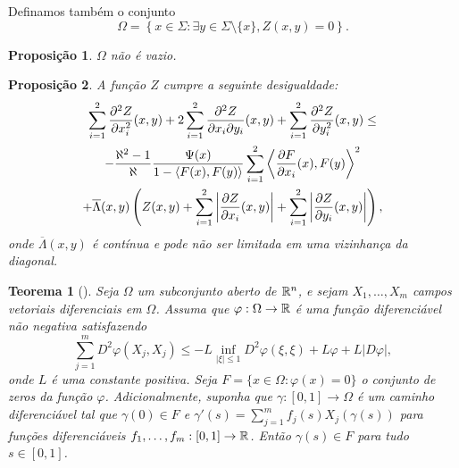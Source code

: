 \documentclass[12pt,a4paper]{beamer}
\newtheorem{teorema}{Teorema}
\newtheorem{proposicao}{Proposição}
\theoremstyle{definition}
\begin{document}
\begin{frame}
		Definamos também o conjunto
	\begin{equation*}
	\Omega = \left\{ x \in \Sigma: \exists y \in \Sigma \setminus \{ x \}, Z(x,y)=0 \right\}.
	\end{equation*}
	
	\begin{proposicao}
		$\Omega$ não é vazio.
	\end{proposicao}
\end{frame}

\begin{frame}
	\begin{proposicao}\label{sum-2nd-derivative-z-inequality}
		A função $Z$ cumpre a seguinte desigualdade:
		\begin{multline*}
			\sum_{i=1}^{2} \frac{\partial^2 Z}{\partial x_i^2}(x,y) + 2 \sum_{i=1}^{2} \frac{\partial^2 Z}{\partial x_i \partial y_i}(x,y) + \sum_{i=1}^{2} \frac{\partial^2 Z}{\partial y_i^2}(x,y) \leq \\
			- \frac{\aleph^2 -1}{\aleph} \frac{\Psi(x)}{1 - \left\langle F(x),F(y) \right\rangle} \sum_{i=1}^{2} \left\langle \frac{\partial F}{\partial x_i}(x),F(y) \right\rangle^2 \\ 
			+ \overline{\Lambda}(x,y) \left( Z(x,y) + \sum_{i=1}^{2} \left| \frac{\partial Z}{\partial x_i}(x,y) \right| + \sum_{i=1}^{2} \left| \frac{\partial Z}{\partial y_i}(x,y) \right| \right),
		\end{multline*}
		onde $\overline{\Lambda}(x,y)$ é contínua e pode não ser limitada em uma vizinhança da diagonal.
	\end{proposicao}
\end{frame}

\begin{frame}
	\begin{teorema}[\cite{Brendle2010}]
		\label{bony's-strict-maximum-principe}
		Seja $\Omega$ um subconjunto aberto de $\mathbb R^n$, e sejam $X_1, \ldots, X_m$ campos vetoriais diferenciais em $\Omega$. Assuma que $\varphi: \Omega \rightarrow \mathbb R$ é uma função diferenciável não negativa satisfazendo
		\begin{equation*}
			\sum_{j=1}^{m} D^2 \varphi (X_j,X_j) \leq -L \inf_{|\xi| \leq 1} D^2 \varphi(\xi,\xi) + L \varphi + L |D \varphi|,
		\end{equation*}
		onde $L$ é uma constante positiva. Seja $F= \{ x \in \Omega: \varphi(x)=0 \}$ o conjunto de zeros da função $\varphi$. Adicionalmente, suponha que $\gamma: [0,1] \rightarrow \Omega$ é um caminho diferenciável tal que $\gamma(0) \in F$ e $\gamma'(s) = \sum_{j=1}^{m} f_j(s) X_j(\gamma(s))$ para funções diferenciáveis $f_1, \ldots, f_m: [0,1] \rightarrow \mathbb R$. Então $\gamma(s) \in F$ para tudo $s \in [0,1]$.
	\end{teorema}
\end{frame}
\end{document}
